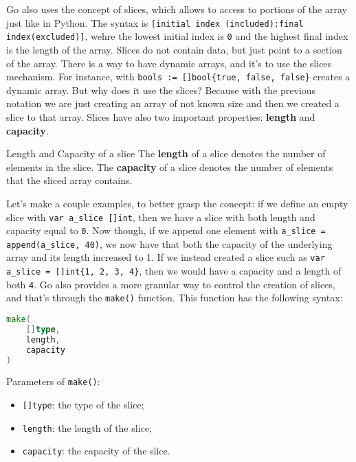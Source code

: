 Go also uses the concept of slices, which allows to access to portions of the array just like in Python. The syntax is \verb|[initial index (included):final index(excluded)]|, wehre the lowest initial index is \verb|0| and the highest final index is the length of the array. Slices do not contain data, but just point to a section of the array.
\nl
There is a way to have dynamic arrays, and it's to use the slices mechanism. For instance, with \verb|bools := []bool{true, false, false}| creates a dynamic array. But why does it use the slices? Because with the previous notation we are just creating an array of not known size and then we created a slice to that array.
\nl
Slices have also two important properties: \textbf{length} and \textbf{capacity}.

\begin{definition}{Length and Capacity of a slice}
    The \textbf{length} of a slice denotes the number of elements in the slice.
    \nl\nl
    The \textbf{capacity} of a slice denotes the number of elements that the sliced array contains.
\end{definition}

Let's make a couple examples, to better grasp the concept: if we define an empty slice with \verb|var a_slice []int|, then we have a slice with both length and capacity equal to \verb|0|. Now though, if we append one element with \verb|a_slice = append(a_slice, 40)|, we now have that both the capacity of the underlying array and its length increased to 1. If we instead created a slice such as \verb|var a_slice = []int{1, 2, 3, 4}|, then we would have a capacity and a length of both \verb|4|.
\nl
Go also provides a more granular way to control the creation of slices, and that's through the \verb|make()| function. This function has the following syntax:

\begin{codedefine}
    \begin{lstlisting}[language = go]
make(
    []type,
    length,
    capacity
)\end{lstlisting}
\tcblower
Parameters of \verb|make()|:
\begin{itemize}
    \item \verb|[]type|: the type of the slice;
    \item \verb|length|: the length of the slice;
    \item \verb|capacity|: the capacity of the slice.
\end{itemize}
\end{codedefine}

